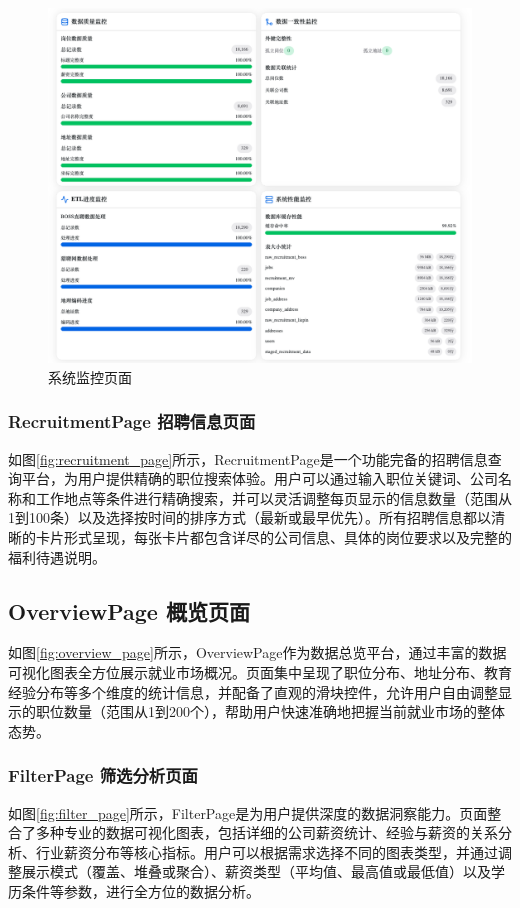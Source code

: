 \begin{figure}[htbp]
    \centering
    \includegraphics[width=1.0\textwidth]{figures/task_page2.png}
    \caption{系统监控页面}
    \label{fig:task_page_2}
\end{figure}


\subsubsection{RecruitmentPage 招聘信息页面}
如图\ref{fig:recruitment_page}所示，RecruitmentPage是一个功能完备的招聘信息查询平台，为用户提供精确的职位搜索体验。用户可以通过输入职位关键词、公司名称和工作地点等条件进行精确搜索，并可以灵活调整每页显示的信息数量（范围从1到100条）以及选择按时间的排序方式（最新或最早优先）。所有招聘信息都以清晰的卡片形式呈现，每张卡片都包含详尽的公司信息、具体的岗位要求以及完整的福利待遇说明。

\subsection{OverviewPage 概览页面}
如图\ref{fig:overview_page}所示，OverviewPage作为数据总览平台，通过丰富的数据可视化图表全方位展示就业市场概况。页面集中呈现了职位分布、地址分布、教育经验分布等多个维度的统计信息，并配备了直观的滑块控件，允许用户自由调整显示的职位数量（范围从1到200个），帮助用户快速准确地把握当前就业市场的整体态势。

\subsubsection{FilterPage 筛选分析页面}
如图\ref{fig:filter_page}所示，FilterPage是为用户提供深度的数据洞察能力。页面整合了多种专业的数据可视化图表，包括详细的公司薪资统计、经验与薪资的关系分析、行业薪资分布等核心指标。用户可以根据需求选择不同的图表类型，并通过调整展示模式（覆盖、堆叠或聚合）、薪资类型（平均值、最高值或最低值）以及学历条件等参数，进行全方位的数据分析。

